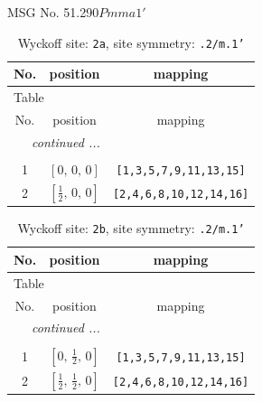 \documentclass[fleqn,8pt]{jsarticle}
\begin{document}
\setcounter{MaxMatrixCols}{32}

\renewcommand{\tablename}{Table~}
\renewcommand{\figurename}{Figure~}
\begin{center}
\LARGE
MSG No. 51.290\quad$Pmma1'$
\end{center}
\renewcommand{\arraystretch}{1.2}
\begin{longtable}{ccc}
\caption{Wyckoff site: {\tt 2a}, site symmetry: {\tt .2/m.1'}}
 \\
 \hline \hline
No. & position & mapping \\ \hline \endfirsthead

\multicolumn{2}{l}{\tablename\ \thetable{}} \\
 \hline \hline
No. & position & mapping \\ \hline \endhead

 \hline \hline
\multicolumn{2}{r}{\footnotesize\it continued ...} \\ \endfoot

 \hline \hline
\multicolumn{2}{r}{} \\ \endlastfoot

1 & $\left[ 0,\, 0,\, 0 \right]$ & {\tt [1,3,5,7,9,11,13,15]} \\ \hline
2 & $\left[ \frac{1}{2},\, 0,\, 0 \right]$ & {\tt [2,4,6,8,10,12,14,16]} \\
\end{longtable}
\renewcommand{\arraystretch}{1.2}
\begin{longtable}{ccc}
\caption{Wyckoff site: {\tt 2b}, site symmetry: {\tt .2/m.1'}}
 \\
 \hline \hline
No. & position & mapping \\ \hline \endfirsthead

\multicolumn{2}{l}{\tablename\ \thetable{}} \\
 \hline \hline
No. & position & mapping \\ \hline \endhead

 \hline \hline
\multicolumn{2}{r}{\footnotesize\it continued ...} \\ \endfoot

 \hline \hline
\multicolumn{2}{r}{} \\ \endlastfoot

1 & $\left[ 0,\, \frac{1}{2},\, 0 \right]$ & {\tt [1,3,5,7,9,11,13,15]} \\ \hline
2 & $\left[ \frac{1}{2},\, \frac{1}{2},\, 0 \right]$ & {\tt [2,4,6,8,10,12,14,16]} \\
\end{longtable}
\end{document}
